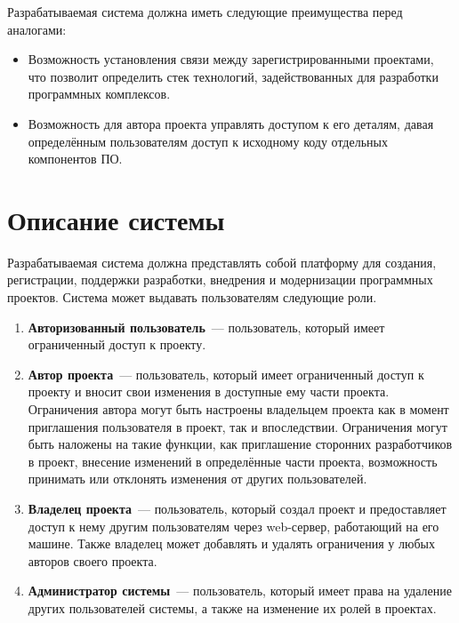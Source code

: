 \documentclass{bmstu}
\begin{document}
  Разрабатываемая система должна иметь следующие преимущества перед
  аналогами:
  \begin{itemize}[label=---]
    \item Возможность установления связи между зарегистрированными
      проектами, что позволит определить стек технологий,
      задействованных для разработки программных комплексов.
    \item Возможность для автора проекта управлять доступом к его
      деталям, давая определённым пользователям доступ к исходному
      коду отдельных компонентов ПО.
  \end{itemize}

  \section{Описание системы} \label{chapter:system-description}

  Разрабатываемая система должна представлять собой платформу для
  создания, регистрации, поддержки разработки, внедрения и
  модернизации программных проектов.
  Система может выдавать пользователям следующие роли.
  \begin{enumerate}[label*=\arabic*.]
    \item \textbf{Авторизованный пользователь}~--- пользователь,
      который имеет ограниченный доступ к проекту.
    \item \textbf{Автор проекта}~--- пользователь, который имеет
      ограниченный доступ к проекту и вносит свои изменения в
      доступные ему части проекта. Ограничения автора могут быть
      настроены владельцем проекта как в момент приглашения
      пользователя в проект, так и впоследствии. Ограничения могут
      быть наложены на такие функции, как приглашение сторонних
      разработчиков в проект, внесение изменений в определённые части
      проекта, возможность принимать или отклонять изменения от других
      пользователей.
    \item \textbf{Владелец проекта}~--- пользователь, который создал
      проект и предоставляет доступ к нему другим пользователям через
      web-сервер, работающий на его машине. Также владелец может
      добавлять и удалять ограничения у любых авторов своего проекта.
    \item \textbf{Администратор системы}~--- пользователь, который
      имеет права на удаление других пользователей системы, а также на
      изменение их ролей в проектах.
  \end{enumerate}
\end{document}
